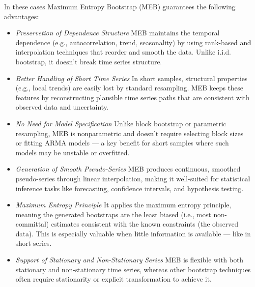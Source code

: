 \documentclass[preprint,11pt,authoryear]{elsarticle}
\begin{document}
In these cases Maximum Entropy Bootstrap (MEB) guarantees the following advantages:

\begin{itemize}
	\item {\it Preservetion of Dependence Structure } MEB maintains the temporal dependence (e.g., autocorrelation, trend, seasonality) by using rank-based and interpolation techniques that reorder and smooth the data. Unlike i.i.d. bootstrap, it doesn’t break time series structure.
	
	\item {\it Better Handling of Short Time Series } In short samples, structural properties (e.g., local trends) are easily lost by standard resampling. MEB keeps these features by reconstructing plausible time series paths that are consistent with observed data and uncertainty.
	
	\item {\it No Need for Model Specification} Unlike block bootstrap or parametric resampling, MEB is nonparametric and doesn’t require selecting block sizes or fitting ARMA models — a key benefit for short samples where such models may be unstable or overfitted.
	
	\item {\it Generation of Smooth Pseudo-Series} MEB produces continuous, smoothed pseudo-series through linear interpolation, making it well-suited for statistical inference tasks like forecasting, confidence intervals, and hypothesis testing.
	
	\item {\it Maximum Entropy Principle} It applies the maximum entropy principle, meaning the generated bootstraps are the least biased (i.e., most non-committal) estimates consistent with the known constraints (the observed data). This is especially valuable when little information is available — like in short series.
	
	\item {\it Support of Stationary and Non-Stationary Series} MEB is flexible with both stationary and non-stationary time series, whereas other bootstrap techniques often require stationarity or explicit transformation to achieve it.
\end{itemize}
\end{document}

